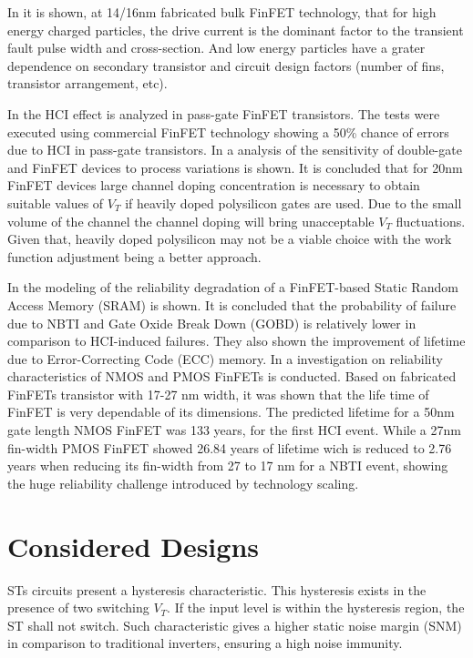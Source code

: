 \documentclass[pgmicro,mestrado,english]{iiufrgs}
\begin{document}
In \cite{FinFET01} it is shown, at 14/16nm fabricated bulk FinFET technology, that for high energy charged particles, the drive current is the dominant factor to the transient fault pulse width and cross-section. And low energy particles have a grater dependence on secondary transistor and circuit design factors (number of fins, transistor arrangement, etc).

In \cite{FinFET02} the HCI effect is analyzed in pass-gate FinFET transistors. The tests were executed using commercial FinFET technology showing a 50\% chance of errors due to HCI in pass-gate transistors. In \cite{FinFET03} a analysis of the sensitivity of double-gate and FinFET devices to process variations is shown. It is concluded that for 20nm FinFET devices large channel doping concentration is necessary to obtain suitable values of $V_T$ if heavily doped polysilicon gates are used. Due to the small volume of the channel the channel doping will bring unacceptable $V_T$ fluctuations. Given that, heavily doped polysilicon may not be a viable choice with the work function adjustment being a better approach.

In \cite{FinFET04} the modeling of the reliability degradation of a FinFET-based Static Random Access Memory (SRAM) is shown. It is concluded that the probability of failure due to NBTI and Gate Oxide Break Down (GOBD) is relatively lower in comparison to HCI-induced failures. They also shown the improvement of lifetime due to Error-Correcting Code (ECC) memory. In \cite{FINFET05} a investigation on reliability characteristics of NMOS and PMOS FinFETs is conducted. Based on fabricated FinFETs transistor with 17-27 nm width, it was shown that the life time of FinFET is very dependable of its dimensions. The predicted lifetime for a 50nm gate length NMOS FinFET was 133 years, for the first HCI event. While a 27nm fin-width PMOS FinFET showed 26.84 years of lifetime wich is reduced to 2.76 years when reducing its fin-width from 27 to 17 nm for a NBTI event, showing the huge reliability challenge introduced by technology scaling.



\chapter{Considered Designs}

STs circuits present a hysteresis characteristic. This hysteresis exists in the presence of two switching $V_T$. If the input level is within the hysteresis region, the ST shall not switch. Such characteristic gives a higher static noise margin (SNM) in comparison to traditional inverters, ensuring a high noise immunity.
\end{document}
